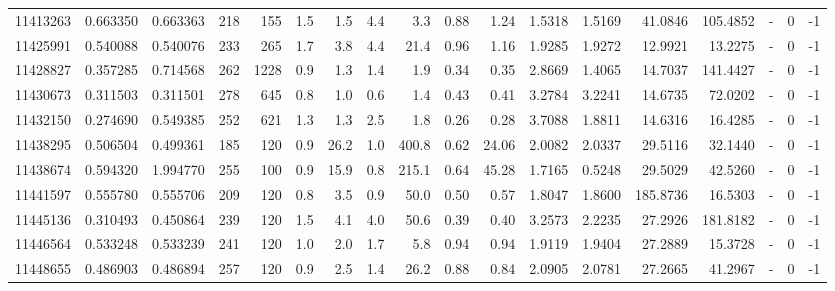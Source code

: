 \begin{tabular}{rrrrrrrrrrrrrrrlrr}
  11413263 & 0.663350 &   0.663363 &  218 &  155 &      1.5 &      1.5 &     4.4 &      3.3 &       0.88 &        1.24 &  1.5318 &  1.5169 &   41.0846 &  105.4852 &             - &        0 &         -1 \\
  11425991 & 0.540088 &   0.540076 &  233 &  265 &      1.7 &      3.8 &     4.4 &     21.4 &       0.96 &        1.16 &  1.9285 &  1.9272 &   12.9921 &   13.2275 &             - &        0 &         -1 \\
  11428827 & 0.357285 &   0.714568 &  262 & 1228 &      0.9 &      1.3 &     1.4 &      1.9 &       0.34 &        0.35 &  2.8669 &  1.4065 &   14.7037 &  141.4427 &             - &        0 &         -1 \\
  11430673 & 0.311503 &   0.311501 &  278 &  645 &      0.8 &      1.0 &     0.6 &      1.4 &       0.43 &        0.41 &  3.2784 &  3.2241 &   14.6735 &   72.0202 &             - &        0 &         -1 \\
  11432150 & 0.274690 &   0.549385 &  252 &  621 &      1.3 &      1.3 &     2.5 &      1.8 &       0.26 &        0.28 &  3.7088 &  1.8811 &   14.6316 &   16.4285 &             - &        0 &         -1 \\
  11438295 & 0.506504 &   0.499361 &  185 &  120 &      0.9 &     26.2 &     1.0 &    400.8 &       0.62 &       24.06 &  2.0082 &  2.0337 &   29.5116 &   32.1440 &             - &        0 &         -1 \\
  11438674 & 0.594320 &   1.994770 &  255 &  100 &      0.9 &     15.9 &     0.8 &    215.1 &       0.64 &       45.28 &  1.7165 &  0.5248 &   29.5029 &   42.5260 &             - &        0 &         -1 \\
  11441597 & 0.555780 &   0.555706 &  209 &  120 &      0.8 &      3.5 &     0.9 &     50.0 &       0.50 &        0.57 &  1.8047 &  1.8600 &  185.8736 &   16.5303 &             - &        0 &         -1 \\
  11445136 & 0.310493 &   0.450864 &  239 &  120 &      1.5 &      4.1 &     4.0 &     50.6 &       0.39 &        0.40 &  3.2573 &  2.2235 &   27.2926 &  181.8182 &             - &        0 &         -1 \\
  11446564 & 0.533248 &   0.533239 &  241 &  120 &      1.0 &      2.0 &     1.7 &      5.8 &       0.94 &        0.94 &  1.9119 &  1.9404 &   27.2889 &   15.3728 &             - &        0 &         -1 \\
  11448655 & 0.486903 &   0.486894 &  257 &  120 &      0.9 &      2.5 &     1.4 &     26.2 &       0.88 &        0.84 &  2.0905 &  2.0781 &   27.2665 &   41.2967 &             - &        0 &         -1 \\

\end{tabular}

